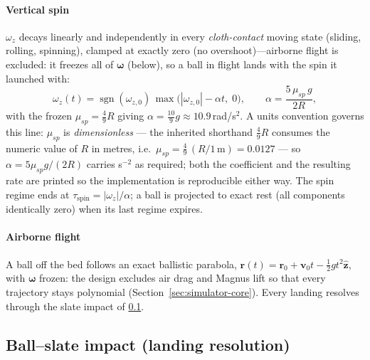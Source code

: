 \paragraph{Vertical spin} $\omega_z$ decays linearly and independently
in every \emph{cloth-contact} moving state (sliding, rolling,
spinning), clamped at exactly zero (no overshoot)---airborne flight is
excluded: it freezes all of $\boldsymbol{\omega}$ (below), so a
ball in flight lands with the spin it launched with:
\begin{equation}
\omega_z(t) = \operatorname{sgn}(\omega_{z,0})\,
\max\!\bigl(|\omega_{z,0}| - \alpha t,\; 0\bigr),
\qquad
\alpha = \frac{5\,\mu_{sp}\,g}{2R},
\label{eq:spin-decay}
\end{equation}
with the frozen $\mu_{sp} = \tfrac{4}{9}R$ giving
$\alpha = \tfrac{10}{9}g \approx 10.9$\,rad/s$^2$. A units convention
governs this line: $\mu_{sp}$ is \emph{dimensionless} --- the
inherited shorthand $\tfrac{4}{9}R$ consumes the numeric value of $R$
in metres, i.e.\ $\mu_{sp} = \tfrac{4}{9}\,(R/\mathrm{1\,m}) = 0.0127$
--- so $\alpha = 5\mu_{sp}g/(2R)$ carries s$^{-2}$ as required; both
the coefficient and the resulting rate are printed so the
implementation is reproducible either way. The spin regime ends
at $\tau_{\mathrm{spin}} = |\omega_z|/\alpha$; a ball is projected to
exact rest (all components identically zero) when its last regime
expires.

\paragraph{Airborne flight} A ball off the bed follows an exact
ballistic parabola, $\mathbf{r}(t) = \mathbf{r}_0 + \mathbf{v}_0 t -
\tfrac{1}{2} g t^{2}\hat{\mathbf{z}}$, with $\boldsymbol{\omega}$
frozen: the design excludes air drag and Magnus lift so that every
trajectory stays polynomial (Section~\ref{sec:simulator-core}). Every
landing resolves through the slate impact of
\ref{sec:appendix-eq-slate}.

\subsection{Ball--slate impact (landing resolution)}
\label{sec:appendix-eq-slate}

